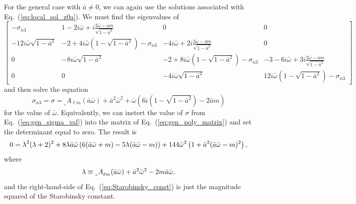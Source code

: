 \documentclass[11pt]{article}
\makeatletter
\newcommand{\scA}[4][]{{}_{{}_{#2}}A^{#1}_{#3}(#4)}
\def\lambdabar{\protect\@lambdabar}
\def\@lambdabar{%
\relax
\bgroup
\def\@tempa{\hbox{\raise.73\ht0
\hbox to0pt{\kern.25\wd0\vrule width.5\wd0
height.1pt depth.1pt\hss}\box0}}%
\mathchoice{\setbox0\hbox{$\displaystyle\lambda$}\@tempa}%
{\setbox0\hbox{$\textstyle\lambda$}\@tempa}%
{\setbox0\hbox{$\scriptstyle\lambda$}\@tempa}%
{\setbox0\hbox{$\scriptscriptstyle\lambda$}\@tempa}%
\egroup
}
\makeatother
\begin{document}
For the general case with $\bar{a}\ne0$, we can again use the
solutions associated with Eq.~(\ref{eq:local_sol_z0a}).  We must find
the eigenvalues of
\begin{equation}\label{eq:gen_poly_matrix}
  \left[\begin{array}{cccc}
    -\sigma_{n3} & 
    1-2i\bar\omega+i\frac{2\bar\omega-am}{\sqrt{1-\bar{a}^2}} &
    0 & 0 \\
    -12i\bar\omega\sqrt{1-\bar{a}^2} &
    -2 + 4i\bar\omega\left(1-\sqrt{1-\bar{a}^2}\right) - \sigma_{n3} &
    -4i\bar\omega + 2i\frac{2\bar\omega-am}{\sqrt{1-\bar{a}^2}} &
    0 \\
    0 & -8i\bar\omega\sqrt{1-\bar{a}^2} &
    -2 + 8i\bar\omega\left(1-\sqrt{1-\bar{a}^2}\right) - \sigma_{n3} &
    -3 - 6i\bar\omega + 3i\frac{2\bar\omega-am}{\sqrt{1-\bar{a}^2}} \\
    0 & 0 & -4i\bar\omega\sqrt{1-\bar{a}^2} &
    12i\bar\omega\left(1-\sqrt{1-\bar{a}^2}\right) - \sigma_{n3}
  \end{array}\right]
\end{equation}
and then solve the equation
\begin{equation}\label{eq:gen_sigma_val}
  \sigma_{n3}=\sigma = \scA{s}{\ell{m}}{\bar{a}\bar\omega} 
    + \bar{a}^2\bar\omega^2 + \bar\omega\left(
       6i\left(1-\sqrt{1-\bar{a}^2}\right) - 2\bar{a}m\right)
\end{equation}
for the value of $\bar\omega$.  Equivalently, we can instert the value
of $\sigma$ from Eq.~(\ref{eq:gen_sigma_val}) into the matrix of
Eq.~(\ref{eq:gen_poly_matrix}) and set the determinant equal to zero.
The result is
\begin{equation}\label{eq:Starobinsky_const}
  0=\lambdabar^2(\lambdabar+2)^2 
  + 8\lambdabar\bar{a}\bar\omega\left(
      6(\bar{a}\bar\omega+m) -5\lambdabar(\bar{a}\bar\omega-m)\right)
      + 144\bar\omega^2\left(1+\bar{a}^2(\bar{a}\bar\omega-m)^2\right),
\end{equation}
where
\begin{equation}
  \lambdabar\equiv \scA{s}{\ell{m}}{\bar{a}\bar\omega}
     + \bar{a}^2\bar\omega^2 - 2m\bar{a}\bar\omega,
\end{equation}
and the right-hand-side of Eq.~(\ref{eq:Starobinsky_const}) is just the
magnitude squared of the Starobinsky constant.
\end{document}
